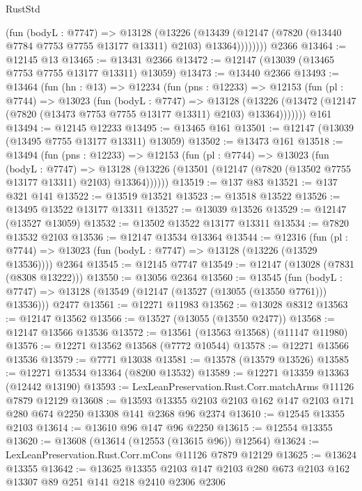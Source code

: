 \begin{lexlean}{RustStd}
\begin{coremodule}
            (fun (bodyL : @7747) =>
            @13128
              (@13226
                (@13439
                  (@12147 (@7820 (@13440 @7784 @7753 @7755 @13177 @13311) @2103) @13364))))))))
    @2366
@13464 := @12145 @13
@13465 := @13431 @2366
@13472 := @12147 (@13039 (@13465 @7753 @7755 @13177 @13311) @13059)
@13473 := @13440 @2366
@13493 := @13464
    (fun (hn : @13) =>
    @12234
      (fun (pns : @12233) =>
      @12153
        (fun (pl : @7744) =>
        @13023
          (fun (bodyL : @7747) =>
          @13128
            (@13226 (@13472 (@12147 (@7820 (@13473 @7753 @7755 @13177 @13311) @2103) @13364)))))))
    @161
@13494 := @12145 @12233
@13495 := @13465 @161
@13501 := @12147 (@13039 (@13495 @7755 @13177 @13311) @13059)
@13502 := @13473 @161
@13518 := @13494
    (fun (pns : @12233) =>
    @12153
      (fun (pl : @7744) =>
      @13023
        (fun (bodyL : @7747) =>
        @13128 (@13226 (@13501 (@12147 (@7820 (@13502 @7755 @13177 @13311) @2103) @13364))))))
@13519 := @137 @83
@13521 := @137 @321 @141
@13522 := @13519 @13521
@13523 := @13518 @13522
@13526 := @13495 @13522 @13177 @13311
@13527 := @13039 @13526
@13529 := @12147 (@13527 @13059)
@13532 := @13502 @13522 @13177 @13311
@13534 := @7820 @13532 @2103
@13536 := @12147 @13534 @13364
@13544 := @12316
    (fun (pl : @7744) => @13023 (fun (bodyL : @7747) => @13128 (@13226 (@13529 @13536))))
    @2364
@13545 := @12145 @7747
@13549 := @12147 (@13028 (@7831 (@8308 @13222)))
@13550 := @13056 @2364
@13560 := @13545
    (fun (bodyL : @7747) => @13128 (@13549 (@12147 (@13527 (@13055 (@13550 @7761))) @13536)))
    @2477
@13561 := @12271 @11983
@13562 := @13028 @8312
@13563 := @12147 @13562
@13566 := @13527 (@13055 (@13550 @2477))
@13568 := @12147 @13566 @13536
@13572 := @13561 (@13563 @13568) (@11147 @11980)
@13576 := @12271 @13562 @13568 (@7772 @10544)
@13578 := @12271 @13566 @13536
@13579 := @7771 @13038
@13581 := @13578 (@13579 @13526)
@13585 := @12271 @13534 @13364 (@8200 @13532)
@13589 := @12271 @13359 @13363 (@12442 @13190)
@13593 := LexLeanPreservation.Rust.Corr.matchArms @11126 @7879 @12129
@13608 := @13593 @13355 @2103 @2103 @162 @147 @2103 @171 @280 @674 @2250 @13308 @141 @2368 @96 @2374
@13610 := @12545 @13355 @2103
@13614 := @13610 @96 @147 @96 @2250
@13615 := @12554 @13355
@13620 := @13608 (@13614 (@12553 (@13615 @96)) @12564)
@13624 := LexLeanPreservation.Rust.Corr.mCons @11126 @7879 @12129
@13625 := @13624 @13355
@13642 := @13625
    @13355
    @2103
    @147
    @2103
    @280
    @673
    @2103
    @162
    @13307
    @89
    @251
    @141
    @218
    @2410
    @2306
    @2306

\end{coremodule}
\end{lexlean}
